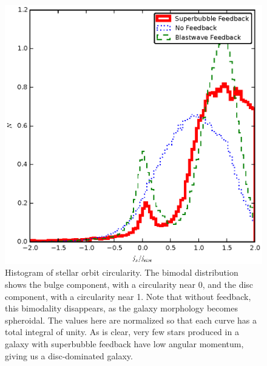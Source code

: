 \begin{figure}
    \includegraphics[width=\textwidth]{figures2/circularity.eps}
    \caption[Stellar orbit circularity histogram]{Histogram
    of stellar orbit circularity.  The bimodal distribution shows the bulge
    component, with a circularity near 0, and the disc component, with a
    circularity near 1.  Note that without feedback, this bimodality disappears,
    as the galaxy morphology becomes spheroidal.  The values here are normalized
    so that each curve has a total integral of unity.  As is clear, very few
    stars produced in a galaxy with superbubble feedback have low angular
    momentum, giving us a disc-dominated galaxy.}
    \label{circularity}
\end{figure}
